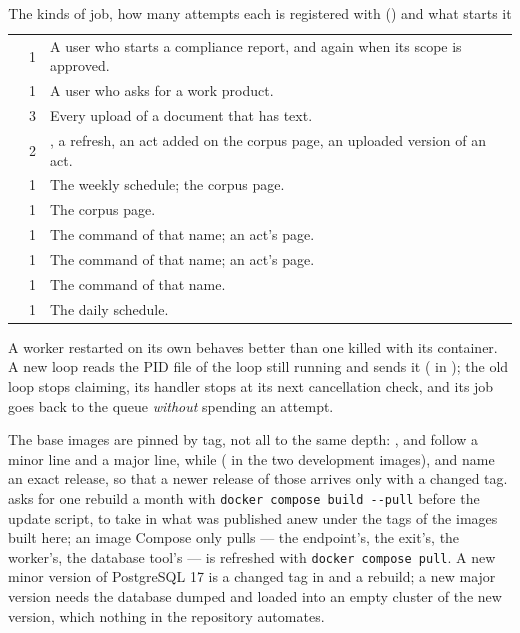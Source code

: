 \begin{table}[H]
\caption{The kinds of job, how many attempts each is registered with ()
and what starts it}\label{tab:ops:jobs}
\begin{tabularx}{\textwidth}{@{}L{48mm}C{16mm}Y@{}}
\toprule
{} &  &  \\
\midrule
{} & 1 & A user who starts a compliance report, and again when its scope is approved. \\
 & 1 & A user who asks for a work product. \\
 & 3 & Every upload of a document that has text. \\
 & 2 & , a refresh, an act added on the corpus page, an uploaded version of an act. \\
 & 1 & The weekly schedule; the corpus page. \\
 & 1 & The corpus page. \\
 & 1 & The command of that name; an act's page. \\
 & 1 & The command of that name; an act's page. \\
 & 1 & The command of that name. \\
 & 1 & The daily schedule. \\
\bottomrule
\end{tabularx}
\end{table}

A worker restarted on its own behaves better than one killed with its container. A new loop
reads the PID file of the loop still running and sends it 
( in ); the old loop stops
claiming, its handler stops at its next cancellation check, and its job goes back to the
queue \emph{without} spending an attempt.

The base images are pinned by tag, not all to the same depth: ,
 and  follow a minor line and
 a major line, while  ( in
the two development images),  and
 name an exact release, so that a newer release of those
arrives only with a changed tag.
 asks for one rebuild a month with \texttt{docker compose build -{}-pull}
before the update script, to take in what was published anew under the tags of the images
built here; an image Compose only pulls --- the endpoint's, the exit's, the worker's, the
database tool's --- is refreshed with \texttt{docker compose pull}. A new minor version of
PostgreSQL 17 is a changed tag in  and a rebuild; a new major
version needs the database dumped and loaded into an empty cluster of the new version, which
nothing in the repository automates.


